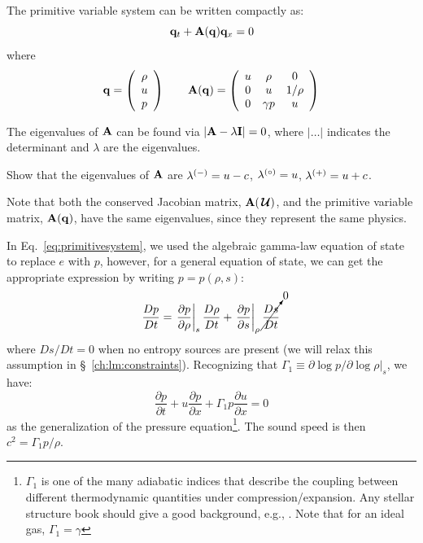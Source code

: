 %
The primitive variable system can be written compactly as:
\begin{equation}
{\bf q}_t + {\bf A}({\bf q}) {\bf q}_x = 0
\end{equation}
where
\begin{equation}
\qb = \left ( \begin{array}{c} \rho \\ u \\ p \end{array} \right )
%
\qquad
\Ab(\qb) = \left ( \begin{array}{ccc} u  & \rho     & 0 \\
                                  0  &  u       & 1/\rho \\
                                  0  & \gamma p & u \end{array} \right )
\label{eq:primitivesystem}
\end{equation}



The eigenvalues of ${\bf A}$ can be found via $| {\bf A} - \lambda {\bf I} | = 0$,
where $|\ldots|$ indicates the determinant and $\lambda$ are the eigenvalues.
\begin{exercise}
{
Show that the eigenvalues of ${\bf A}$ are $\lambda^{(-)} = u -c$, $\lambda^{(\circ)} = u$, $\lambda^{(+)} = u+c$.
}
\end{exercise}
Note that both the conserved Jacobian matrix, ${\bf A}({\,\boldsymbol{\mathcal{U}}})$, and the
primitive variable matrix, ${\bf A}({\bf q})$, have the same eigenvalues,
 since they represent the same physics.

In Eq.~\ref{eq:primitivesystem}, we used the algebraic gamma-law
equation of state to replace $e$ with $p$, however, for a general
equation of state, we can get the appropriate expression by writing $p
= p(\rho, s)$:
\begin{equation}
\label{eq:euler:presnosource}
\frac{Dp}{Dt} = \left . \frac{\partial p}{\partial \rho} \right |_s
     \frac{D\rho}{Dt} +
     \left . \frac{\partial p}{\partial s} \right |_\rho
     \cancelto{0}{\frac{Ds}{Dt}}
\end{equation}
where $Ds/Dt = 0$ when no entropy sources are present (we will relax this
assumption in \S~\ref{ch:lm:constraints}).  Recognizing
that $\Gamma_1 \equiv \partial \log p/\partial \log \rho |_s$, we have:
\begin{equation}
\frac{\partial p}{\partial t} + u \frac{\partial p}{\partial x}
  + \Gamma_1 p \frac{\partial u}{\partial x} = 0  \label{eq:euler:pgeneral}
\end{equation}
as the generalization of the pressure equation\footnote{$\Gamma_1$ is one of the
many adiabatic indices that describe the coupling between different
thermodynamic quantities under compression/expansion.  Any stellar structure
book should give a good background, e.g., \cite{HKT}.  Note that for an ideal gas, $\Gamma_1 = \gamma$}.
The sound speed is then $c^2 = \Gamma_1 p /\rho$.

